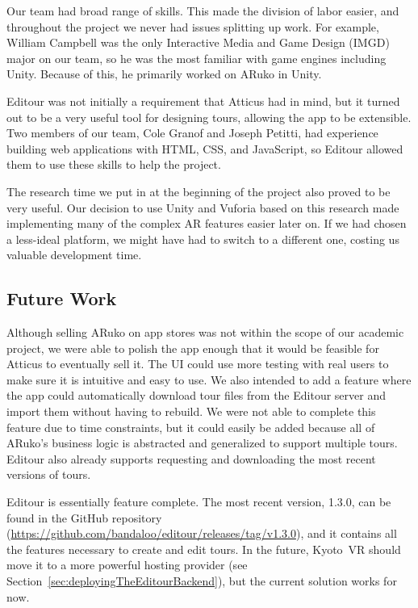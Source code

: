 \documentclass[a4paper, 10pt, american, titlepage]{article}
\begin{document}
Our team had broad range of skills. This made the division of labor easier, and
throughout the project we never had issues splitting up work. For example,
William Campbell was the only Interactive Media and Game Design (IMGD) major on
our team, so he was the most familiar with game engines including Unity. Because
of this, he primarily worked on ARuko in Unity.

Editour was not initially a requirement that Atticus had in mind, but it turned
out to be a very useful tool for designing tours, allowing the app to be
extensible. Two members of our team, Cole Granof and Joseph Petitti, had
experience building web applications with HTML, CSS, and JavaScript, so Editour
allowed them to use these skills to help the project.

The research time we put in at the beginning of the project also proved to be
very useful. Our decision to use Unity and Vuforia based on this research made
implementing many of the complex AR features easier later on. If we had chosen a
less-ideal platform, we might have had to switch to a different one, costing us
valuable development time.

\subsection{Future Work}
\label{sec:futureWork}

Although selling ARuko on app stores was not within the scope of our academic
project, we were able to polish the app enough that it would be feasible for
Atticus to eventually sell it. The UI could use more testing with real users to
make sure it is intuitive and easy to use. We also intended to add a feature
where the app could automatically download tour files from the Editour server
and import them without having to rebuild. We were not able to complete this
feature due to time constraints, but it could easily be added because all of
ARuko's business logic is abstracted and generalized to support multiple tours.
Editour also already supports requesting and downloading the most recent
versions of tours.

Editour is essentially feature complete. The most recent version, 1.3.0, can be
found in the GitHub repository
(\url{https://github.com/bandaloo/editour/releases/tag/v1.3.0}), and it contains
all the features necessary to create and edit tours. In the future, Kyoto~VR
should move it to a more powerful hosting provider (see
Section~\ref{sec:deployingTheEditourBackend}), but the current solution works
for now.
\end{document}
